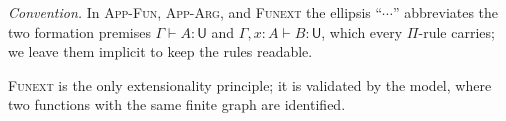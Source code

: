 \documentclass[11pt]{article}
\newcommand{\hastype}[3]{#1 \vdash #2 : #3}
\newcommand{\conveq}[4]{#1 \vdash #2 = #3 : #4}
\newcommand{\Pitype}[2]{\Pi(#1)\,#2}
\newcommand{\Lamterm}[2]{\lambda(#1)\,#2}
\newcommand{\App}[2]{#1\;#2}
\newcommand{\substone}[2]{#1[#2]}
\newcommand{\wkn}[1]{#1^{+}}
\newcommand{\U}{\mathsf{U}}
\theoremstyle{plain}
\theoremstyle{definition}
\begin{document}
\emph{Convention.}  In \textsc{App-Fun}, \textsc{App-Arg}, and \textsc{Funext}
the ellipsis ``$\cdots$'' abbreviates the two formation premises
$\hastype{\Gamma}{A}{\U}$ and $\hastype{\Gamma, x{:}A}{B}{\U}$, which every
$\Pi$-rule carries; we leave them implicit to keep the rules readable.

\textsc{Funext} is the only extensionality principle; it is validated by the
model, where two functions with the same finite graph are identified.
\end{document}
